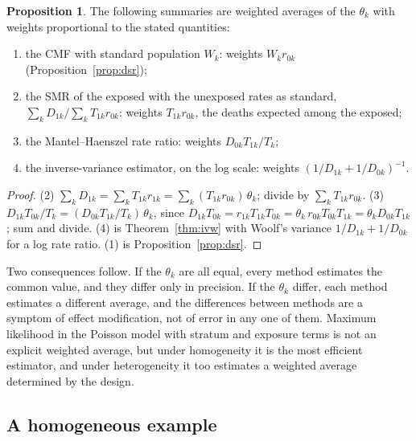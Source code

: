 \documentclass[11pt,a4paper]{article}
\numberwithin{equation}{section}
\theoremstyle{definition}
\newtheorem{prop}[thm]{Proposition}
\begin{document}
\begin{prop}
\label{prop:weights}
The following summaries are weighted averages of the $\theta_k$ with weights proportional to the stated quantities:
\begin{enumerate}
\item the CMF with standard population $W_k$: weights $W_k r_{0k}$ (Proposition~\ref{prop:dsr});
\item the SMR of the exposed with the unexposed rates as standard, $\sum_k D_{1k}/\sum_k T_{1k}r_{0k}$: weights $T_{1k}r_{0k}$, the deaths expected among the exposed;
\item the Mantel--Haenszel rate ratio: weights $D_{0k}T_{1k}/T_k$;
\item the inverse-variance estimator, on the log scale: weights $(1/D_{1k} + 1/D_{0k})^{-1}$.
\end{enumerate}
\end{prop}

\begin{proof}
(2) $\sum_k D_{1k} = \sum_k T_{1k}r_{1k} = \sum_k (T_{1k}r_{0k})\,\theta_k$; divide by $\sum_k T_{1k}r_{0k}$. (3) $D_{1k}T_{0k}/T_k = (D_{0k}T_{1k}/T_k)\,\theta_k$, since $D_{1k}T_{0k} = r_{1k}T_{1k}T_{0k} = \theta_k\,r_{0k}T_{0k}T_{1k} = \theta_k D_{0k}T_{1k}$;
sum and divide. (4) is Theorem~\ref{thm:ivw} with Woolf's variance $1/D_{1k} + 1/D_{0k}$ for a log rate ratio. (1) is Proposition~\ref{prop:dsr}.
\end{proof}

Two consequences follow. If the $\theta_k$ are all equal, every method estimates the common value, and they differ only in precision. If
the $\theta_k$ differ, each method estimates a different average, and the differences between methods are a symptom of effect
modification, not of error in any one of them. Maximum likelihood in the Poisson model with stratum and exposure terms is not an explicit
weighted average, but under homogeneity it is the most efficient estimator, and under heterogeneity it too estimates a weighted
average determined by the design.

\subsection{A homogeneous example}
\end{document}
